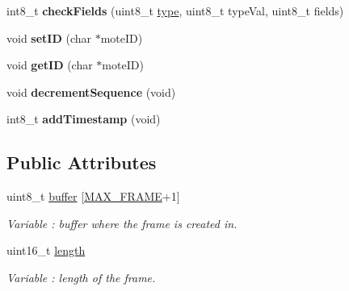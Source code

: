 \begin{DoxyCompactItemize}
\item 
int8\+\_\+t {\bfseries check\+Fields} (uint8\+\_\+t \hyperlink{_sd_fat_structs_8h_a1d127017fb298b889f4ba24752d08b8e}{type}, uint8\+\_\+t type\+Val, uint8\+\_\+t fields)\hypertarget{class_wasp_frame_a10207aef11325295b063dd71b0d33a61}{}\label{class_wasp_frame_a10207aef11325295b063dd71b0d33a61}

\item 
void {\bfseries set\+ID} (char $\ast$mote\+ID)\hypertarget{class_wasp_frame_a70a3da91fe77ced1139fc51e23014fea}{}\label{class_wasp_frame_a70a3da91fe77ced1139fc51e23014fea}

\item 
void {\bfseries get\+ID} (char $\ast$mote\+ID)\hypertarget{class_wasp_frame_ab1ac1a5af48b7bd6dfcd149a8415a76f}{}\label{class_wasp_frame_ab1ac1a5af48b7bd6dfcd149a8415a76f}

\item 
void {\bfseries decrement\+Sequence} (void)\hypertarget{class_wasp_frame_ac8f030a175f6ab911287cd3db9a1ea0f}{}\label{class_wasp_frame_ac8f030a175f6ab911287cd3db9a1ea0f}

\item 
int8\+\_\+t {\bfseries add\+Timestamp} (void)\hypertarget{class_wasp_frame_a3fdad43f903829247a413bb795627bb0}{}\label{class_wasp_frame_a3fdad43f903829247a413bb795627bb0}

\end{DoxyCompactItemize}
\subsection*{Public Attributes}
\begin{DoxyCompactItemize}
\item 
uint8\+\_\+t \hyperlink{class_wasp_frame_a85189b90e448e7de179dcb908d4fe3d2}{buffer} \mbox{[}\hyperlink{_wasp_frame_8h_a99a8aeb9f036381a1f4b1c1a1e4fe9e4}{M\+A\+X\+\_\+\+F\+R\+A\+ME}+1\mbox{]}\hypertarget{class_wasp_frame_a85189b90e448e7de179dcb908d4fe3d2}{}\label{class_wasp_frame_a85189b90e448e7de179dcb908d4fe3d2}

\begin{DoxyCompactList}\small\item\em Variable \+: buffer where the frame is created in. \end{DoxyCompactList}\item 
uint16\+\_\+t \hyperlink{class_wasp_frame_a40d14449bd0e77f7f355f6d2b6a43788}{length}\hypertarget{class_wasp_frame_a40d14449bd0e77f7f355f6d2b6a43788}{}\label{class_wasp_frame_a40d14449bd0e77f7f355f6d2b6a43788}

\begin{DoxyCompactList}\small\item\em Variable \+: length of the frame. \end{DoxyCompactList}\end{DoxyCompactItemize}


